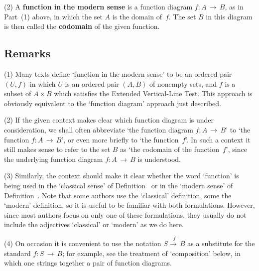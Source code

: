\V

        (2) A {\bf function in the modern sense} is a function diagram $f:A \,{\rightarrow}\, B$, as in Part~(1) above,
    in which the set $A$ is the domain of~$f$. The set $B$ in this diagram is then called the {\bf codomain} of the given function.

\V

            \subsection{\small{\bf Remarks}}
            \label{RemrkA30.22}

\hspace*{\parindent} (1) Many texts define `function in the modern sense' to  be an ordered pair $(U,f)$ in which $U$ is an ordered pair $(A,B)$ of nonempty sets,
    and $f$ is a subset of $A{\times}B$ which satisfies the Extended Vertical-Line Test. This approach is obviously equivalent to the `function diagram' approach just described.

\V

        (2) If the given context makes clear which function diagram is under consideration,
    we shall often abbreviate `the function diagram $f:A \,{\rightarrow}\, B$' to `the function $f:A \,{\rightarrow}\, B$', or even more briefly to `the function~$f$'.
    In such a context it still makes sense to refer to the set $B$ as `the codomain of the function~$f$', since the underlying function diagram $f:A \,{\rightarrow}\, B$ is understood.

\V

        (3) Similarly, the context should make it clear whether the word `function'
    is being used in the `classical sense' of Definition~ or in the `modern sense' of Definition~.
    Note that some authors use the `classical' definition, some the `modern' definition, so it is useful to be familiar with both formulations.
    However, since most authors focus on only one of these formulations, they usually do not include the adjectives `classical' or `modern' as we do here.

\V

        (4) On occasion it is convenient to use the notation $S\stackrel{f\,\,\,\,\,}{{\longrightarrow}\,B}$ as a substitute for the standard
    $f:S \,{\rightarrow}\, B$; for example, see the treatment of `composition' below, in which one strings together a pair of function diagrams.

